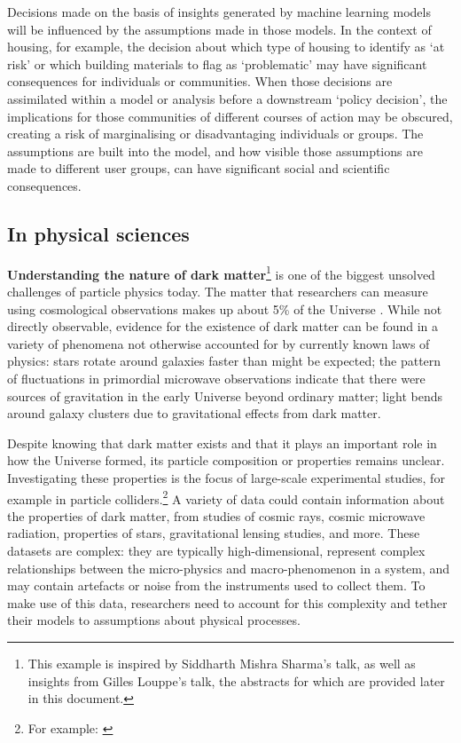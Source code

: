 Decisions made on the basis of insights generated by machine learning
models will be influenced by the assumptions made in those models. In
the context of housing, for example, the decision about which type of
housing to identify as `at risk' or which building materials to flag as
`problematic' may have significant consequences for individuals or
communities. When those decisions are assimilated within a model or
analysis before a downstream `policy decision', the implications for
those communities of different courses of action may be obscured,
creating a risk of marginalising or disadvantaging individuals or
groups. The assumptions are built into the model, and how visible those
assumptions are made to different user groups, can have significant
social and scientific consequences.

\subsection{In physical sciences}\label{in-physical-sciences}

\textbf{Understanding the nature of dark matter}\footnote{This example
  is inspired by Siddharth Mishra Sharma's talk, as well as insights
  from Gilles Louppe's talk, the abstracts for which are provided later
  in this document.} is one of the biggest unsolved challenges of
particle physics today. The matter that researchers can measure using
cosmological observations makes up about 5\% of the Universe \citep{NASA-dark}.
While not directly observable, evidence for the existence of dark matter
can be found in a variety of phenomena not otherwise accounted for by
currently known laws of physics: stars rotate around galaxies faster
than might be expected; the pattern of fluctuations in primordial
microwave observations indicate that there were sources of gravitation
in the early Universe beyond ordinary matter; light bends around galaxy
clusters due to gravitational effects from dark matter.

Despite knowing that dark matter exists and that it plays an important
role in how the Universe formed, its particle composition or properties
remains unclear. Investigating these properties is the focus of
large-scale experimental studies, for example in particle
colliders.\footnote{For example: \citep{ATLAS-experiment08}} A variety of data could
contain information about the properties of dark matter, from studies of
cosmic rays, cosmic microwave radiation, properties of stars,
gravitational lensing studies, and more. These datasets are complex:
they are typically high-dimensional, represent complex relationships
between the micro-physics and macro-phenomenon in a system, and may
contain artefacts or noise from the instruments used to collect them. To
make use of this data, researchers need to account for this complexity
and tether their models to assumptions about physical processes.


